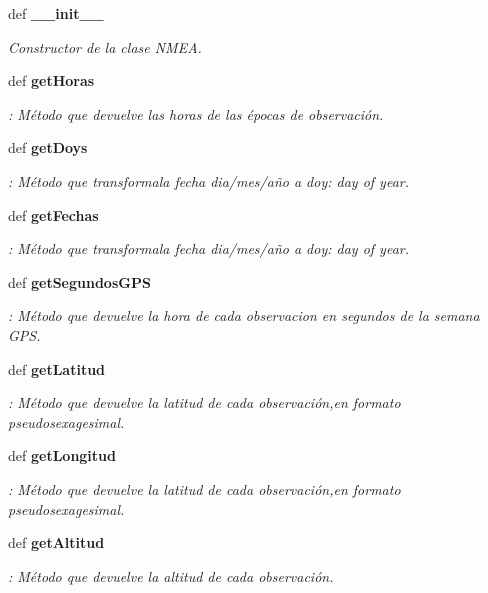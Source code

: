 \begin{DoxyCompactItemize}
\item 
def {\bf \-\_\-\-\_\-init\-\_\-\-\_\-}
\begin{DoxyCompactList}\small\item\em Constructor de la clase N\-M\-E\-A. \end{DoxyCompactList}\item 
def {\bf get\-Horas}
\begin{DoxyCompactList}\small\item\em \-: Método que devuelve las horas de las épocas de observación. \end{DoxyCompactList}\item 
def {\bf get\-Doys}
\begin{DoxyCompactList}\small\item\em \-: Método que transformala fecha dia/mes/año a doy\-: day of year. \end{DoxyCompactList}\item 
def {\bf get\-Fechas}
\begin{DoxyCompactList}\small\item\em \-: Método que transformala fecha dia/mes/año a doy\-: day of year. \end{DoxyCompactList}\item 
def {\bf get\-Segundos\-G\-P\-S}
\begin{DoxyCompactList}\small\item\em \-: Método que devuelve la hora de cada observacion en segundos de la semana G\-P\-S. \end{DoxyCompactList}\item 
def {\bf get\-Latitud}
\begin{DoxyCompactList}\small\item\em \-: Método que devuelve la latitud de cada observación,en formato pseudosexagesimal. \end{DoxyCompactList}\item 
def {\bf get\-Longitud}
\begin{DoxyCompactList}\small\item\em \-: Método que devuelve la latitud de cada observación,en formato pseudosexagesimal. \end{DoxyCompactList}\item 
def {\bf get\-Altitud}
\begin{DoxyCompactList}\small\item\em \-: Método que devuelve la altitud de cada observación. \end{DoxyCompactList}\item 

\end{DoxyCompactItemize}
